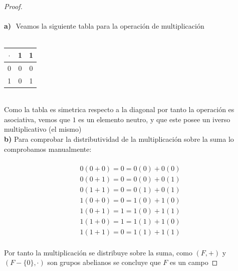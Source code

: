 \documentclass[11pt,letterpaper]{article}
\begin{document}
\begin{proof}\,\\
	\,\\
	\textbf{a)}\,\, Veamos la siguiente tabla para la operaci\'on de multiplicaci\'on\,\\
	\,\\
	\begin{table}[h!]
		\centering
		 \begin{tabular}{||c c c ||} 
		 \hline
		 $\cdot$ & 1 & 1 \\ [0.5ex] 
		 \hline\hline
		 0 & 0 & 0 \\ 
		 1 & 0 & 1 \\  [1ex] 
		 \hline
		 \end{tabular}
		\end{table}
	  \,\\
	  Como la tabla es simetrica respecto a la diagonal por tanto la operaci\'on es asociativa, vemos que $1$ es un elemento neutro, y que este posee un iverso multiplicativo (el mismo)\,\\
	  \newpage
	  \textbf{b)}\,\,Para comprobar la distributividad de la multiplicaci\'on sobre la suma lo comprobamos manualmente:\,\\
	  \,\\
	  \begin{align*}
		0(0+0)=0=0(0)+0(0)\\
		0(0+1)=0=0(0)+0(1)\\
		0(1+1)=0=0(1)+0(1)\\
		1(0+0)=0=1(0)+1(0)\\
		1(0+1)=1=1(0)+1(1)\\
		1(1+0)=1=1(1)+1(0)\\
		1(1+1)=0=1(1)+1(1)
	  \end{align*}\,\\
	  Por tanto la multiplicaci\'on se distribuye sobre la suma, como $(F,+)$ y $(F-\{0\},\cdot)$ son grupos abelianos se concluye que $F$ es un campo	  
\end{proof}\,\\
\end{document}
